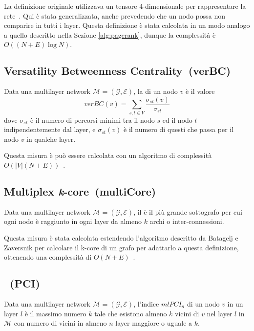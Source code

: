 La definizione originale utilizzava un tensore 4-dimensionale per 
rappresentare la rete~\cite{dedomenico:versatile}. Qui è stata generalizzata, anche prevedendo che un nodo possa non comparire 
in tutti i layer.
Questa definizione è stata calcolata in un modo analogo a quello descritto nella Sezione \ref{alg:pagerank},
dunque la complessità è $O((N + E)\log{N})$.

\subsection{Versatility Betweenness Centrality~(verBC)}

\begin{definizione}[\verBetweennessCentrality]
    Data una multilayer network $\mathcal{M}=(\mathcal{G}, \mathcal{E})$, la 
    \emph{\verBetweennessCentrality} di un nodo $v$ è il valore 
    \begin{equation*}
        \mathit{verBC}(v) = \sum_{s, t \in V} \frac{\sigma_{st}(v)}{\sigma_{st}}
    \end{equation*}
    dove $\sigma_{st}$ è il numero di percorsi minimi tra il nodo $s$ ed il nodo $t$
    indipendentemente dal layer, e $\sigma_{st}(v)$ è il numero di questi che passa 
    per il nodo $v$ in qualche layer.
\end{definizione}
Questa misura è può essere calcolata con un algoritmo di 
complessità $O\left(|V|\left(N+E\right)\right)$~\cite{dedomenico:verbetw}.

\subsection{Multiplex \emph{k}-core~(multiCore)}

\begin{definizione}[\multiCore]
    Data una multilayer network $\mathcal{M}=(\mathcal{G}, \mathcal{E})$, il \emph{\multiCore} è
    il più grande sottografo per cui ogni nodo è raggiunto in ogni layer da almeno $k$ archi o
    inter-connessioni.
\end{definizione}

Questa misura è stata calcolata estendendo l'algoritmo descritto da Batagelj e Zaversnik per calcolare 
il k-core di un grafo per adattarlo a questa definizione, ottenendo una complessità di $O(N + E)$~\cite{batagelj:kcore}.

\subsection{\PCI~(PCI)}
\begin{definizione}
    Data una multilayer network $\mathcal{M}=(\mathcal{G}, \mathcal{E})$, 
    l'indice $\mathit{mlPCI}_n$ di un nodo $v$ in un layer $l$ 
    è il massimo numero $k$ tale che esistono almeno $k$ vicini di $v$ nel layer $l$ in $\mathcal{M}$
    con numero di vicini in almeno $n$ layer maggiore o uguale a $k$.
\end{definizione}

